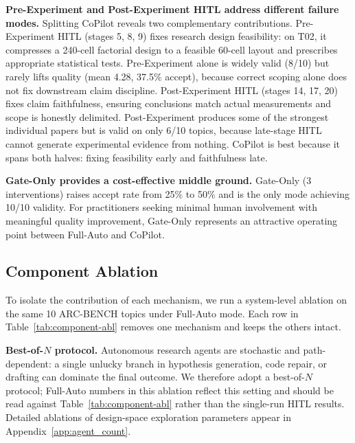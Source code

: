 \documentclass{llmxive}
\begin{document}
\noindent \textbf{Pre-Experiment and Post-Experiment HITL address different failure modes.} Splitting CoPilot reveals two complementary contributions. Pre-Experiment HITL (stages 5, 8, 9) fixes research design feasibility: on T02, it compresses a 240-cell factorial design to a feasible 60-cell layout and prescribes appropriate statistical tests. Pre-Experiment alone is widely valid (8/10) but rarely lifts quality (mean 4.28, 37.5\% accept), because correct scoping alone does not fix downstream claim discipline. Post-Experiment HITL (stages 14, 17, 20) fixes claim faithfulness, ensuring conclusions match actual measurements and scope is honestly delimited. Post-Experiment produces some of the strongest individual papers but is valid on only 6/10 topics, because late-stage HITL cannot generate experimental evidence from nothing. CoPilot is best because it spans both halves: fixing feasibility early and faithfulness late.

\noindent \textbf{Gate-Only provides a cost-effective middle ground.} Gate-Only (3 interventions) raises accept rate from 25\% to 50\% and is the only mode achieving 10/10 validity. For practitioners seeking minimal human involvement with meaningful quality improvement, Gate-Only represents an attractive operating point between Full-Auto and CoPilot.

\vspace{-0.3em}
\subsection{Component Ablation}
\label{sec:component_abl}
\vspace{-0.3em}

To isolate the contribution of each mechanism, we run a system-level ablation on the same 10 ARC-BENCH topics under Full-Auto mode. Each row in Table~\ref{tab:component-abl} removes one mechanism and keeps the others intact.

\noindent \textbf{Best-of-$N$ protocol.}
Autonomous research agents are stochastic and path-dependent: a single unlucky branch in hypothesis generation, code repair, or drafting can dominate the final outcome. We therefore adopt a best-of-$N$ protocol; Full-Auto numbers in this ablation reflect this setting and should be read against Table~\ref{tab:component-abl} rather than the single-run HITL results. Detailed ablations of design-space exploration parameters appear in Appendix~\ref{app:agent_count}.
\end{document}
